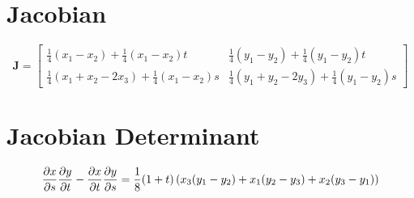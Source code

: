 \documentclass[letterpaper]{article}
\numberwithin{equation}{section}
\begin{document}
	\section{Jacobian}
	\[\bm{J} = \begin{bmatrix}  \frac{1}{4}(x_1 - x_2) + \frac{1}{4}(x_1 - x_2)t &   \frac{1}{4}(y_1 - y_2) + \frac{1}{4}(y_1 - y_2)t \\  \frac{1}{4}(x_1 + x_2 - 2x_3) + \frac{1}{4}(x_1-x_2)s &  \frac{1}{4}(y_1 + y_2 - 2y_3) + \frac{1}{4}(y_1-y_2)s \end{bmatrix}\]
	\section{Jacobian Determinant}
		\[\pdiff[x]{s}\pdiff[y]{t} - \pdiff[x]{t}\pdiff[y]{s} = \frac{1}{8}(1 + t)\left(x_3(y_1-y_2) + x_1(y_2-y_3) + x_2(y_3-y_1)\right)\]
	
\end{document}
